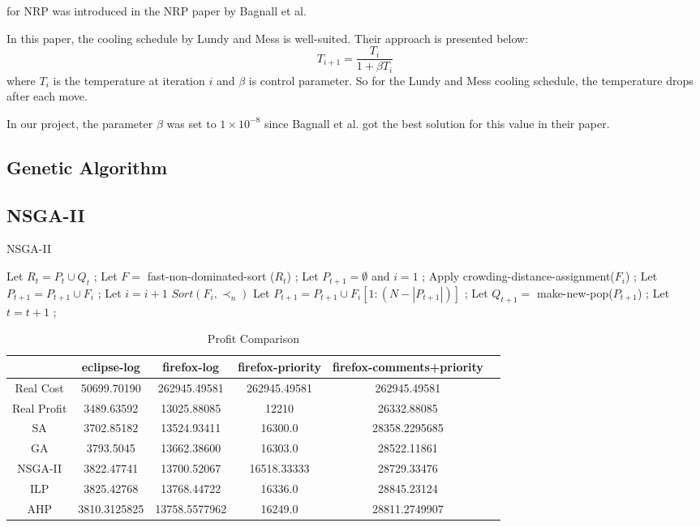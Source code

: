 for NRP was introduced in the NRP paper by Bagnall et al.\cite{NRP}


In this paper, the cooling schedule by Lundy and Mess\cite{LundySA} is well-suited. Their approach is presented below:
\[
    T_{i+1} = \frac{T_i}{1 + \beta T_i}
\]
where $T_i$ is the temperature at iteration $i$ and $\beta$ is control parameter. So for the Lundy and Mess cooling schedule, the temperature drops after each move.

In our project, the parameter $\beta$ was set to $1 \times 10^{-8}$ since Bagnall et al. got the best solution for this value in their paper.

\subsection{Genetic Algorithm}

\subsection{NSGA-II}

\begin{algorithm}
\caption{NSGA-II}\label{alg:nsga2}
\begin{algorithmic}
        \State Let $R_t = P_t \cup Q_t$ ;
        \State Let $F = $ fast-non-dominated-sort ($R_t$) ; %
        \State Let $P_{t+1} = \emptyset$ and $i = 1$ ;
            \State Apply crowding-distance-assignment($F_i$) ; %
            \State Let $P_{t+1} = P_{t+1} \cup F_i$ ;
            \State Let $i = i + 1$
        \EndWhile
        \State $Sort(F_i, \prec_n)$
        \State Let $P_{t+1} = P_{t+1} \cup F_i[1:(N - |P_{t+1}|)]$ ;
        \State Let $Q_{t+1} = $ make-new-pop($P_{t+1}$) ;
        \State Let $t = t + 1$ ;
    \EndWhile\label{euclidendwhile}
\end{algorithmic}
\end{algorithm}

\begin{table*}
  \caption{Profit Comparison}
  \label{tab:commands}
  \begin{tabular}{cccccl}
    \toprule
    &eclipse-log&firefox-log&firefox-priority&firefox-comments+priority\\
    \midrule
    Real Cost&50699.70190&262945.49581&262945.49581&262945.49581 \\
    Real Profit&3489.63592&13025.88085&12210&26332.88085 \\
    \hline
    SA&3702.85182&13524.93411&16300.0&28358.2295685 \\
    GA&3793.5045&13662.38600&16303.0&28522.11861 \\
    NSGA-II&3822.47741&13700.52067&16518.33333&28729.33476 \\
    ILP&3825.42768&13768.44722&16336.0&28845.23124 \\
    AHP&3810.3125825&13758.5577962&16249.0&28811.2749907 \\
    \bottomrule
  \end{tabular}
\end{table*}

